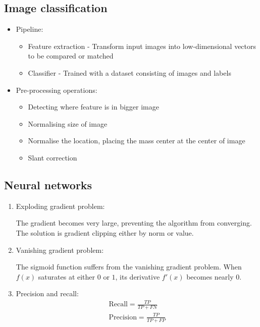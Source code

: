 \documentclass[9pt]{article}
\begin{document}
\begin{multicols*}{2}
    \subsection{Image classification}
    \begin{itemize}
        \item Pipeline:
        \begin{itemize}
            \item Feature extraction - Transform input images into low-dimensional vectors to be compared or matched 
            \item Classifier - Trained with a dataset consisting of images and labels 
        \end{itemize}

        \item Pre-processing operations:
        \begin{itemize}
            \item Detecting where feature is in bigger image 
            \item Normalising size of image 
            \item Normalise the location, placing the mass center at the center of image 
            \item Slant correction 
        \end{itemize}
    \end{itemize}

    \subsection{Neural networks}
    \begin{enumerate}
        \item Exploding gradient problem:
        
        The gradient becomes very large, preventing the algorithm from converging. The solution is gradient clipping either by norm or value.


        \item Vanishing gradient problem:
        
        The sigmoid function suffers from the vanishing gradient problem. When $f(x)$ saturates at either $0$ or $1$, its derivative $f'(x)$ becomes nearly $0$.

        \item Precision and recall:
        \begin{gather*}
            \text{Recall} = \frac{TP}{TP + FN} \\ 
            \text{Precision} = \frac{TP}{TP + FP} 
        \end{gather*}
            

\end{enumerate}
\end{multicols*}
\end{document}
